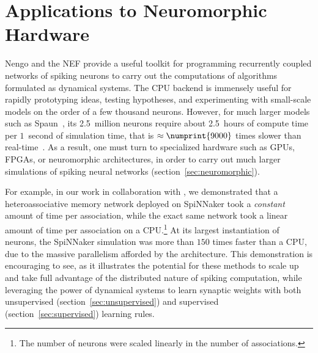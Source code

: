 \chapter{Applications to Neuromorphic Hardware}
\label{chapt:results}

Nengo and the NEF provide a useful toolkit for programming recurrently coupled networks of spiking neurons to carry out the computations of algorithms formulated as dynamical systems.
The CPU backend is immensely useful for rapidly prototyping ideas, testing hypotheses, and experimenting with small-scale models on the order of a few thousand neurons.
However, for much larger models such as Spaun~\citep{eliasmith2012}, its 2.5~million neurons require about 2.5~hours of compute time per $1$~second of simulation time, that is $\approx \numprint{9000}$ times slower than real-time~\citep{stewart2014large, mundy2016real}.
As a result, one must turn to specialized hardware such as GPUs, FPGAs, or neuromorphic architectures, in order to carry out much larger simulations of spiking neural networks (section~\ref{sec:neuromorphic}).

For example, in our work in collaboration with \citet{knight2016}, we demonstrated that a heteroassociative memory network deployed on SpiNNaker took a \emph{constant} amount of time per association, while the exact same network took a linear amount of time per association on a CPU.\footnote{%
The number of neurons were scaled linearly in the number of associations.}
At its largest instantiation of  neurons, the SpiNNaker simulation was more than $150$ times faster than a CPU, due to the massive parallelism afforded by the architecture.
This demonstration is encouraging to see, as it illustrates the potential for these methods to scale up and take full advantage of the distributed nature of spiking computation, while leveraging the power of dynamical systems to learn synaptic weights with both unsupervised (section~\ref{sec:unsupervised}) and supervised (section~\ref{sec:supervised}) learning rules.

